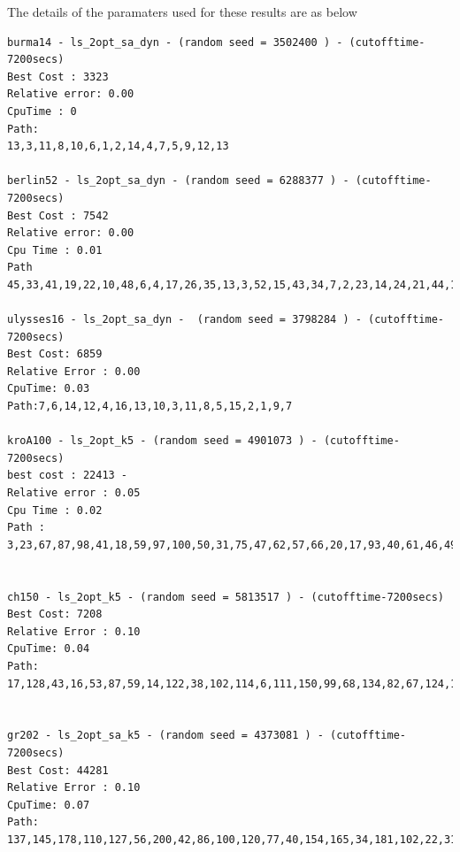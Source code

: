 \documentclass[twoside,11pt]{article}
\begin{document}
\item
The details of the paramaters used for these results are as below
\begin{verbatim}
burma14 - ls_2opt_sa_dyn - (random seed = 3502400 ) - (cutofftime-7200secs)
Best Cost : 3323 
Relative error: 0.00
CpuTime : 0
Path:
13,3,11,8,10,6,1,2,14,4,7,5,9,12,13

berlin52 - ls_2opt_sa_dyn - (random seed = 6288377 ) - (cutofftime-7200secs)
Best Cost : 7542 
Relative error: 0.00
Cpu Time : 0.01
Path 45,33,41,19,22,10,48,6,4,17,26,35,13,3,52,15,43,34,7,2,23,14,24,21,44,12,38,8,32,36,40,30,50,20,25,27,9,46,49,39,47,28,16,29,11,42,31,51,18,37,1,5,45

ulysses16 - ls_2opt_sa_dyn -  (random seed = 3798284 ) - (cutofftime-7200secs)
Best Cost: 6859 
Relative Error : 0.00 
CpuTime: 0.03 
Path:7,6,14,12,4,16,13,10,3,11,8,5,15,2,1,9,7

kroA100 - ls_2opt_k5 - (random seed = 4901073 ) - (cutofftime-7200secs)
best cost : 22413 - 
Relative error : 0.05
Cpu Time : 0.02
Path :  3,23,67,87,98,41,18,59,97,100,50,31,75,47,62,57,66,20,17,93,40,61,46,49,86,52,54,26,15,53,96,7,2,45,82,27,10,60,74,48,83,90,63,30,80,5,25,39,68,14,99,65,69,38,44,76,51,36,11,88,72,89,73,13,35,28,85,9,22,33,71,4,29,79,34,55,81,24,43,84,91,94,95,64,37,42,70,32,16,12,19,77,6,1,8,56,78,21,92,58,3


ch150 - ls_2opt_k5 - (random seed = 5813517 ) - (cutofftime-7200secs)
Best Cost: 7208 
Relative Error : 0.10 
CpuTime: 0.04
Path: 17,128,43,16,53,87,59,14,122,38,102,114,6,111,150,99,68,134,82,67,124,143,127,141,44,1,58,19,60,116,22,42,15,119,104,40,144,36,83,56,34,136,105,115,72,54,80,32,89,66,50,65,126,94,28,69,117,103,96,52,78,11,118,97,63,18,88,61,145,39,75,29,7,31,24,47,100,125,73,55,33,86,62,5,146,25,106,130,137,90,57,149,132,84,121,109,129,120,23,41,91,131,10,70,21,108,79,81,27,12,123,92,48,2,45,138,51,110,71,76,140,9,85,74,101,35,98,46,64,148,13,95,30,8,20,133,147,49,26,77,142,112,107,3,4,93,113,37,139,135,17


gr202 - ls_2opt_sa_k5 - (random seed = 4373081 ) - (cutofftime-7200secs)
Best Cost: 44281 
Relative Error : 0.10 
CpuTime: 0.07
Path: 137,145,178,110,127,56,200,42,86,100,120,77,40,154,165,34,181,102,22,31,118,80,180,78,51,107,26,193,65,161,121,29,9,15,36,173,79,94,92,142,89,55,7,3,106,194,18,43,45,99,131,146,68,117,134,141,85,91,27,171,199,122,163,58,149,159,133,82,93,130,152,176,32,116,37,139,151,160,63,186,50,155,174,83,81,35,103,47,172,13,5,157,167,62,10,11,135,14,57,19,153,98,150,113,112,136,183,25,192,88,67,101,179,189,125,23,87,97,66,95,39,108,168,73,53,90,190,109,188,4,143,147,28,59,185,105,21,175,64,148,114,52,76,187,170,119,124,69,111,24,71,17,198,48,16,72,70,191,49,197,166,8,182,202,54,126,201,196,115,96,104,164,33,41,44,12,84,162,75,1,184,169,195,140,158,132,74,138,20,61,144,38,156,46,128,123,30,60,6,129,177,2,137

\end{verbatim}
\end{document}
